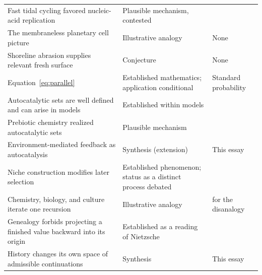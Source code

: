 \documentclass[11pt]{article}
\begin{document}
\begin{longtable}{p{}p{}p{}}
Fast tidal cycling favored nucleic-acid replication & Plausible mechanism, contested & \cite{lathe,varga} \\
The membraneless planetary cell picture & Illustrative analogy & None \\
Shoreline abrasion supplies relevant fresh surface & Conjecture & None \\
Equation~\eqref{eq:parallel} & Established mathematics; application conditional & Standard probability \\
Autocatalytic sets are well defined and can arise in models & Established within models & \cite{kauffman,hordijk2004,hordijk2019} \\
Prebiotic chemistry realized autocatalytic sets & Plausible mechanism & \cite{hordijk2019} \\
Environment-mediated feedback as autocatalysis & Synthesis (extension) & This essay \\
Niche construction modifies later selection & Established phenomenon; status as a distinct process debated & \cite{oslf} \\
Chemistry, biology, and culture iterate one recursion & Illustrative analogy & \cite{sperber} for the disanalogy \\
Genealogy forbids projecting a finished value backward into its origin & Established as a reading of Nietzsche & \cite{nietzsche} \\
History changes its own space of admissible continuations & Synthesis & This essay \\
\hline
\end{longtable}
\end{document}
